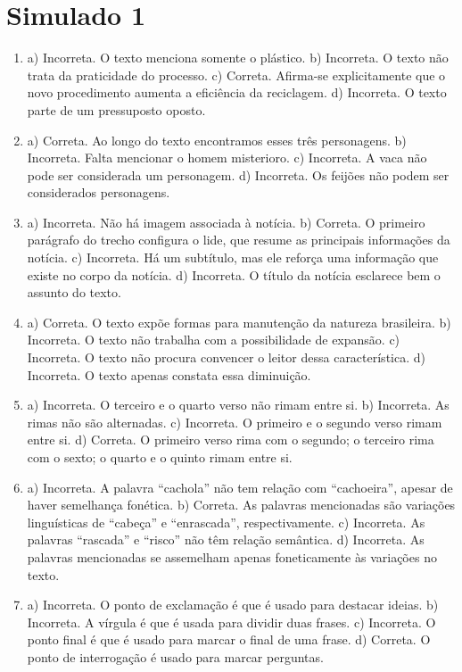 \section*{Simulado 1}

\begin{enumerate}

\item
a) Incorreta. O texto menciona somente o plástico.
b) Incorreta. O texto não trata da praticidade do processo.
c) Correta. Afirma-se explicitamente que o novo procedimento
aumenta a eficiência da reciclagem.
d) Incorreta. O texto parte de um pressuposto oposto.

\item
a) Correta. Ao longo do texto encontramos esses três personagens.
b) Incorreta. Falta mencionar o homem misterioro.
c) Incorreta. A vaca não pode ser considerada um personagem.
d) Incorreta. Os feijões não podem ser considerados personagens.

\item
a) Incorreta. Não há imagem associada à notícia.
b) Correta. O primeiro parágrafo do trecho configura o lide, que resume as principais informações da notícia.
c) Incorreta. Há um subtítulo, mas ele reforça uma informação que existe no corpo da notícia.
d) Incorreta. O título da notícia esclarece bem o assunto do texto.

\item
a) Correta. O texto expõe formas para manutenção da natureza brasileira.
b) Incorreta. O texto não trabalha com a possibilidade de expansão.
c) Incorreta. O texto não procura convencer o leitor dessa característica.
d) Incorreta. O texto apenas constata essa diminuição.

\item
a) Incorreta. O terceiro e o quarto verso não rimam entre si.
b) Incorreta. As rimas não são alternadas.
c) Incorreta. O primeiro e o segundo verso rimam entre si.
d) Correta. O primeiro verso rima com o segundo; o terceiro rima com o sexto; o quarto e o quinto rimam entre si.

\item
a) Incorreta. A palavra “cachola” não tem relação com “cachoeira”, apesar de haver semelhança fonética.
b) Correta. As palavras mencionadas são variações linguísticas de “cabeça” e “enrascada”, respectivamente.
c) Incorreta. As palavras “rascada” e “risco” não têm relação semântica.
d) Incorreta. As palavras mencionadas se assemelham apenas foneticamente às variações no texto.

\item
a) Incorreta. O ponto de exclamação é que é usado para destacar ideias.
b) Incorreta. A vírgula é que é usada para dividir duas frases.
c) Incorreta. O ponto final é que é usado para marcar o final de uma frase.
d) Correta. O ponto de interrogação é usado para marcar perguntas.


\end{enumerate}
